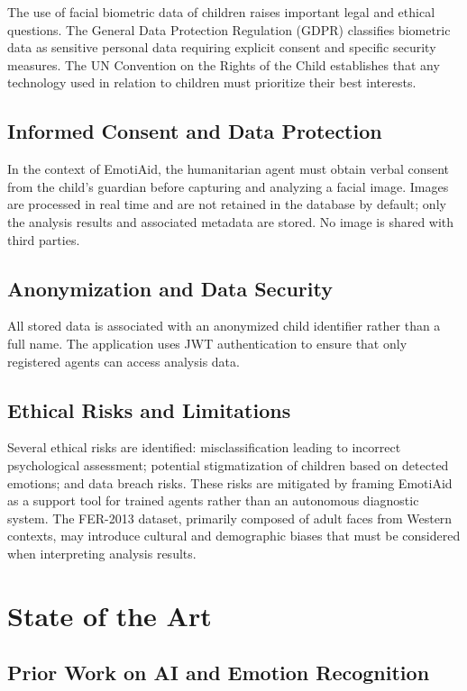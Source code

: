 \documentclass[a4paper,12pt,oneside]{report}
\begin{document}
The use of facial biometric data of children raises important legal and ethical
questions. The General Data Protection Regulation (GDPR) classifies biometric
data as sensitive personal data requiring explicit consent and specific security
measures. The UN Convention on the Rights of the Child establishes that any
technology used in relation to children must prioritize their best interests.

\subsection{Informed Consent and Data Protection}

In the context of EmotiAid, the humanitarian agent must obtain verbal consent
from the child's guardian before capturing and analyzing a facial image. Images
are processed in real time and are not retained in the database by default; only
the analysis results and associated metadata are stored. No image is shared with
third parties.

\subsection{Anonymization and Data Security}

All stored data is associated with an anonymized child identifier rather than a
full name. The application uses JWT authentication to ensure that only registered
agents can access analysis data.

\subsection{Ethical Risks and Limitations}

Several ethical risks are identified: misclassification leading to incorrect
psychological assessment; potential stigmatization of children based on detected
emotions; and data breach risks. These risks are mitigated by framing EmotiAid
as a support tool for trained agents rather than an autonomous diagnostic system.
The FER-2013 dataset, primarily composed of adult faces from Western contexts,
may introduce cultural and demographic biases that must be considered when
interpreting analysis results.

\section{State of the Art}

\subsection{Prior Work on AI and Emotion Recognition}
\end{document}
